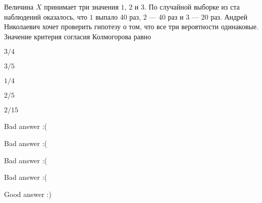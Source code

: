 
\begin{question}
Величина \(X\) принимает три значения \(1\), \(2\) и \(3\). По случайной
выборке из ста наблюдений оказалось, что \(1\) выпало 40 раз, \(2\) ---
40 раз и \(3\) --- 20 раз. Андрей Николаевич хочет проверить гипотезу о
том, что все три вероятности одинаковые. Значение критерия согласия
Колмогорова равно
\begin{answerlist}
  \item \(3/4\)
  \item \(3/5\)
  \item \(1/4\)
  \item \(2/5\)
  \item \(2/15\)
\end{answerlist}
\end{question}

\begin{solution}
\begin{answerlist}
  \item Bad answer :(
  \item Bad answer :(
  \item Bad answer :(
  \item Bad answer :(
  \item Good answer :)
\end{answerlist}
\end{solution}

